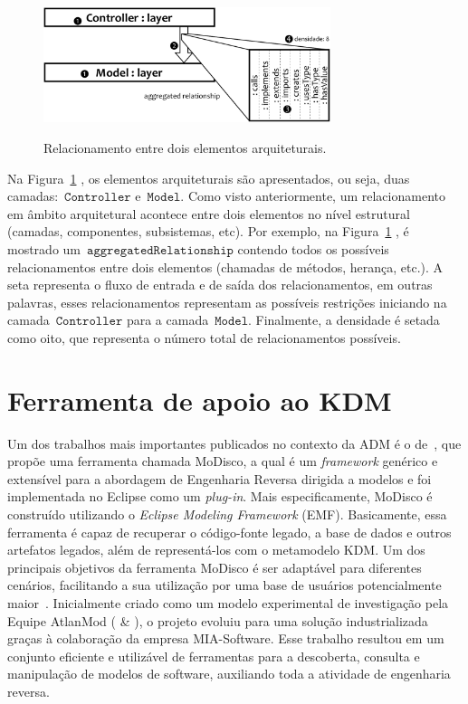 \begin{figure}[!ht]
	\centering
	\caption{Relacionamento entre dois elementos arquiteturais.}
	\includegraphics[width=3.3in]{images/relationshipExample1.pdf}
	\fautor
	\label{fig:relationship_example_1}
\end{figure}


Na Figura~\ref{fig:relationship_example_1} , os elementos arquiteturais são apresentados, ou seja, duas camadas:~$\mathtt{Controller}$ e~$\mathtt{Model}$. Como visto anteriormente, um relacionamento em âmbito arquitetural acontece entre dois elementos no nível estrutural (camadas, componentes, subsistemas, etc). Por exemplo, na Figura~\ref{fig:relationship_example_1} , é mostrado um~$\mathtt{aggregatedRelationship}$ contendo todos os possíveis relacionamentos  entre dois elementos (chamadas de métodos, herança, etc.). A seta  representa o fluxo de entrada e de saída dos relacionamentos, em outras palavras, esses relacionamentos representam as possíveis restrições iniciando na camada~$\mathtt{Controller}$  para a camada~$\mathtt{Model}$. Finalmente, a densidade  é setada como oito, que representa o número total de relacionamentos possíveis.


\section{Ferramenta de apoio ao KDM}\label{sec:Ferramenta_de_apoio_KDM_capitulo}

Um dos trabalhos mais importantes publicados no contexto da ADM é o de~, que propõe uma ferramenta chamada MoDisco, a qual é um \textit{framework} genérico e extensível para a abordagem de Engenharia Reversa dirigida a modelos e foi implementada no  Eclipse como um \textit{plug-in}. Mais especificamente, MoDisco é construído utilizando o \textit{Eclipse Modeling Framework} (EMF). Basicamente, essa ferramenta é capaz de recuperar o código-fonte legado, a base de dados e outros artefatos legados, além de representá-los com o metamodelo KDM. Um dos principais objetivos da ferramenta MoDisco é ser adaptável para diferentes cenários, facilitando a sua utilização por uma base de usuários potencialmente maior~\cite{Bruneliere_2014}. Inicialmente criado como um modelo experimental de investigação pela Equipe AtlanMod ( \& ), o projeto evoluiu para uma solução industrializada graças à colaboração da empresa MIA-Software. Esse trabalho resultou em um conjunto eficiente e utilizável de ferramentas para a descoberta, consulta e manipulação de modelos de software, auxiliando toda a atividade de engenharia reversa.

